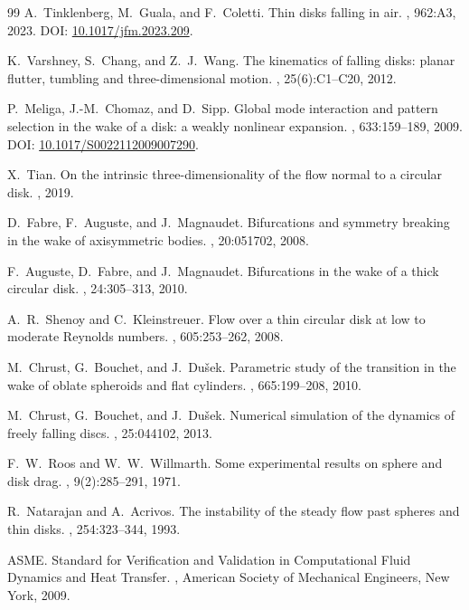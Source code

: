 \documentclass[11pt,a4paper]{article}
\begin{document}
\begin{thebibliography}{99}
A.~Tinklenberg, M.~Guala, and F.~Coletti.
\newblock Thin disks falling in air.
, 962:A3, 2023.
\newblock DOI: \href{https://doi.org/10.1017/jfm.2023.209}{10.1017/jfm.2023.209}.

K.~Varshney, S.~Chang, and Z.~J.~Wang.
\newblock The kinematics of falling disks: planar flutter, tumbling and three-dimensional motion.
, 25(6):C1--C20, 2012.

P.~Meliga, J.-M.~Chomaz, and D.~Sipp.
\newblock Global mode interaction and pattern selection in the wake of a disk: a weakly nonlinear expansion.
, 633:159--189, 2009.
\newblock DOI: \href{https://doi.org/10.1017/S0022112009007290}{10.1017/S0022112009007290}.

X.~Tian.
\newblock On the intrinsic three-dimensionality of the flow normal to a circular disk.
, 2019.

D.~Fabre, F.~Auguste, and J.~Magnaudet.
\newblock Bifurcations and symmetry breaking in the wake of axisymmetric bodies.
, 20:051702, 2008.

F.~Auguste, D.~Fabre, and J.~Magnaudet.
\newblock Bifurcations in the wake of a thick circular disk.
, 24:305--313, 2010.

A.~R.~Shenoy and C.~Kleinstreuer.
\newblock Flow over a thin circular disk at low to moderate Reynolds numbers.
, 605:253--262, 2008.

M.~Chrust, G.~Bouchet, and J.~Du\v{s}ek.
\newblock Parametric study of the transition in the wake of oblate spheroids and flat cylinders.
, 665:199--208, 2010.

M.~Chrust, G.~Bouchet, and J.~Du\v{s}ek.
\newblock Numerical simulation of the dynamics of freely falling discs.
, 25:044102, 2013.

F.~W.~Roos and W.~W.~Willmarth.
\newblock Some experimental results on sphere and disk drag.
, 9(2):285--291, 1971.

R.~Natarajan and A.~Acrivos.
\newblock The instability of the steady flow past spheres and thin disks.
, 254:323--344, 1993.

ASME.
\newblock Standard for Verification and Validation in Computational Fluid Dynamics and Heat Transfer.
, American Society of Mechanical Engineers, New York, 2009.
\end{thebibliography}
\end{document}
